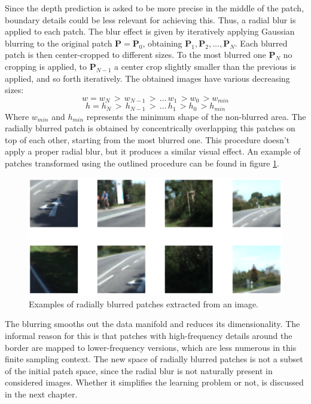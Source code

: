 Since the depth prediction is asked to be more precise in the middle of the patch, boundary details could be less relevant for achieving this.
Thus, a radial blur is applied to each patch.
The blur effect is given by iteratively applying Gaussian blurring to the original patch $\mathbf{P} = \mathbf{P}_{0}$, obtaining $\mathbf{P}_{1}, \mathbf{P}_{2}, \dotsc, \mathbf{P}_{N}$.
Each blurred patch is then center-cropped to different sizes.
To the most blurred one $\mathbf{P}_{N}$ no cropping is applied, to $\mathbf{P}_{N-1}$ a center crop slightly smaller than the previous is applied, and so forth iteratively.
The obtained images have various decreasing sizes:
\[
    w = w_{N} \, > \, w_{N-1} \, > \, \dotsc \, w_{1} \, > w_{0} \, > w_{min}
\]\[
    h = h_{N} \, > \, h_{N-1} \, > \, \dotsc \, h_{1} \, > h_{0} \, > h_{min}
\]
Where $w_{min}$ and $h_{min}$ represents the minimum shape of the non-blurred area.
The radially blurred patch is obtained by concentrically overlapping this patches on top of each other, starting from the most blurred one.
This procedure doesn't apply a proper radial blur, but it produces a similar visual effect.
An example of patches transformed using the outlined procedure can be found in figure \ref{fig:blur}.
\begin{figure}
    \begin{adjustwidth}{-0.2\textwidth}{-0.2\textwidth}
    \centering
    \includegraphics[scale=0.4]{figs/blur}
    \end{adjustwidth}
    \caption{
        Examples of radially blurred patches extracted from an image.
        \label{fig:blur}
    }
\end{figure}
The blurring smooths out the data manifold and reduces its dimensionality.
The informal reason for this is that patches with high-frequency details around the border are mapped to lower-frequency versions, which are less numerous in this finite sampling context.
The new space of radially blurred patches is not a subset of the initial patch space, since the radial blur is not naturally present in considered images.
Whether it simplifies the learning problem or not, is discussed in the next chapter.

